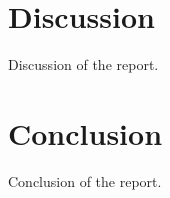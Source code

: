 \documentclass[10pt, a4paper]{amsart}
\begin{document}
\section{Discussion}
Discussion of the report.
\section{Conclusion}
Conclusion of the report.




\end{document}
